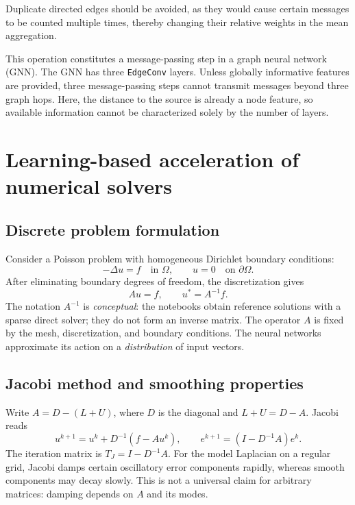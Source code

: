 \documentclass[11pt,a4paper]{article}
\begin{document}
Duplicate directed edges should be avoided, as they would
cause certain messages to be counted multiple times,
thereby changing their relative weights in the
mean aggregation.

This operation constitutes a message-passing step in
a graph neural network (GNN).
The GNN has three \texttt{EdgeConv} layers. Unless globally informative features are provided, three message-passing steps cannot transmit messages beyond three graph hops. Here, the distance to the source is already a node feature, so available information cannot be characterized solely by the number of layers.
\begin{center}\end{center}

\section{Learning-based acceleration of numerical solvers}

\subsection{Discrete problem formulation}

Consider a Poisson problem with homogeneous Dirichlet boundary conditions:
\[-\Delta u=f\quad\text{in }\Omega,\qquad u=0\quad\text{on }\partial\Omega.\]
After eliminating boundary degrees of freedom, the discretization gives
\[Au=f,\qquad u^*=A^{-1}f.\]
The notation $A^{-1}$ is \emph{conceptual}: the notebooks obtain reference solutions with a sparse direct solver; they do not form an inverse matrix. The operator $A$ is fixed by the mesh, discretization, and boundary conditions. The neural networks approximate its action on a \emph{distribution} of input vectors.

\subsection{Jacobi method and smoothing properties}

Write $A=D-(L+U)$, where $D$ is the diagonal and $L+U=D-A$. Jacobi reads
\[u^{k+1}=u^k+D^{-1}(f-Au^k),\qquad e^{k+1}=(I-D^{-1}A)e^k.\]
The iteration matrix is $T_J=I-D^{-1}A$. For the model Laplacian on a regular grid, Jacobi damps certain oscillatory error components rapidly, whereas smooth components may decay slowly. This is not a universal claim for arbitrary matrices: damping depends on $A$ and its modes.
\end{document}
